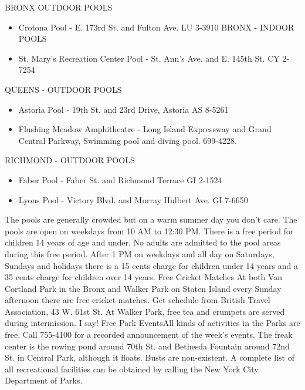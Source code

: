 \documentclass[11pt,twoside,a4paper]{book}
\begin{document}
BRONX  OUTDOOR POOLS
\begin{itemize}
 \item Crotona Pool - E. 173rd St. and Fulton Ave. LU 3-3910
BRONX - INDOOR POOLS 
\item St. Mary's Recreation Center Pool - St. Ann's Ave. and E. 145th St. CY 2-7254
\end{itemize}

QUEENS - OUTDOOR POOLS
\begin{itemize}
\item Astoria Pool - 19th St. and 23rd Drive, Astoria AS 8-5261 
\item Flushing Meadow Amphitheatre - Long Island Expressway and Grand Central Parkway, Swimming pool and diving pool. 699-4228.
\end{itemize}

RICHMOND - OUTDOOR POOLS
\begin{itemize}
\item Faber Pool - Faber St. and Richmond Terrace GI 2-1524 
\item Lyons Pool - Victory Blvd. and Murray Hulbert Ave. GI 7-6650
\end{itemize}

The pools are generally crowded but on a warm summer day you don't care. The pools are open on weekdays from 10 AM to 12:30 PM. There is a free period for children 14 years of age and under. No adults are admitted to the pool areas during this free period. After 1 PM on weekdays and all day on Saturdays, Sundays and holidays there is a 15 cents charge for children under 14 years and a 35 cents charge for children over 14 years. Free Cricket Matches At both Van Cortland Park in the Bronx and Walker Park on Staten Island every Sunday afternoon there are free cricket matches. Get schedule from British Travel Association, 43 W. 61st St. At Walker Park, free tea and crumpets are served during intermission. I say! Free Park EventsAll kinds of activities in the Parks are free. Call 755-4100 for a recorded announcement of the week's events. The freak center is the rowing pond around 70th St. and Bethesda Fountain around 72nd St. in Central Park, although it floats. Busts are non-existent. A complete list of all recreational facilities can be obtained  by calling the New York City Department of Parks.~\\
\end{document}
